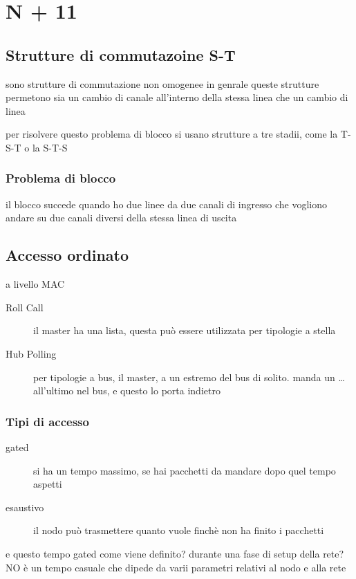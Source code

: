 \documentclass[11pt]{article}
\begin{document}
\section{N + 11}
\label{sec:org507c258}
\subsection{Strutture di commutazoine S-T}
\label{sec:orgc6c4013}
sono strutture di commutazione non omogenee
in genrale queste strutture permetono sia un cambio di canale all'interno della stessa linea che un cambio di linea

per risolvere questo problema di blocco si usano strutture a tre stadii, come la T-S-T o la S-T-S

\subsubsection{Problema di blocco}
\label{sec:org03d61fc}
il blocco succede quando ho due linee da due canali di ingresso che vogliono andare su due canali diversi della stessa linea di uscita

\subsection{Accesso ordinato}
\label{sec:org9097783}
a livello MAC
\begin{description}
\item[{Roll Call}] il master ha una lista, questa può essere utilizzata per tipologie a stella
\item[{Hub Polling}] per tipologie a bus, il master, a un estremo del bus di solito. manda un \ldots{} all'ultimo nel bus, e questo lo porta indietro
\end{description}

\subsubsection{Tipi di accesso}
\label{sec:orgc667083}
\begin{description}
\item[{gated}] si ha un tempo massimo, se hai pacchetti da mandare dopo quel tempo aspetti
\item[{esaustivo}] il nodo può trasmettere quanto vuole finchè non ha finito i pacchetti
\end{description}

e questo tempo gated come viene definito?
durante una fase di setup della rete? NO
è un tempo casuale che dipede da varii parametri relativi al nodo e alla rete
\end{document}
